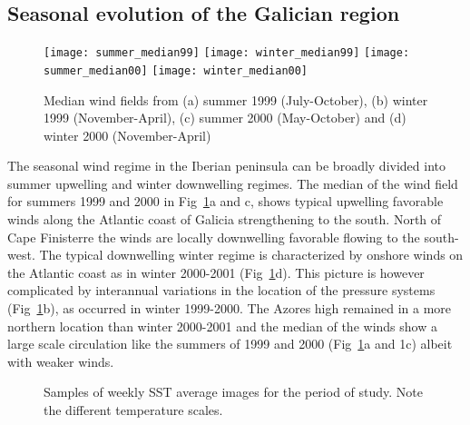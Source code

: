 \subsection{Seasonal evolution of the Galician region}
\begin{figure}[t]
\noindent
\texttt{[image: summer\_median99]}
\texttt{[image: winter\_median99]}
\texttt{[image: summer\_median00]}
\texttt{[image: winter\_median00]}
\caption{Median wind fields from (a) summer 1999 (July-October),
(b) winter 1999 (November-April), (c) summer 2000 (May-October)
and (d) winter 2000 (November-April)}\label{fig:windsmedian}
\end{figure}
The seasonal wind regime in the Iberian peninsula can be broadly
divided into summer upwelling and winter downwelling regimes. The
median of the wind field for summers 1999 and 2000 in
{Fig~\ref{fig:windsmedian}}a and c, shows typical upwelling
favorable winds along the Atlantic coast of Galicia strengthening
to the south. North of Cape Finisterre the winds are locally
downwelling favorable flowing to the south-west. The typical
downwelling winter regime is characterized by onshore winds on the
Atlantic coast as in winter 2000-2001
(Fig~\ref{fig:windsmedian}d). This picture is however complicated
by interannual variations in the location of the pressure systems
(Fig~\ref{fig:windsmedian}b), as occurred in winter 1999-2000. The
Azores high remained in a more northern location than winter
2000-2001 and the median of the winds show a large scale
circulation like the summers of 1999 and 2000
(Fig~\ref{fig:windsmedian}a and 1c) albeit with weaker winds.
\begin{figure}
%
%
%
%
\caption{Samples of weekly SST average images for the period of
study. Note the different temperature scales.}
\label{fig:windssstsummary}
\end{figure}

